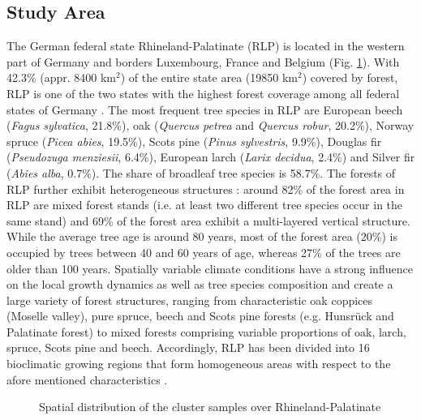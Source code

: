 \subsection{Study Area}
\label{sec:studyarea}

The German federal state Rhineland-Palatinate (RLP) is located in the western part of Germany and borders Luxembourg, France and Belgium (Fig. \ref{fig:Study Area}). With 42.3\% (appr. 8400 km$^2$) of the entire state area (19850 km$^2$) covered by forest, RLP is one of the two states with the highest forest coverage among all federal states of Germany \citep{bwi3}.  The most frequent tree species in RLP are European beech (\textit{Fagus sylvatica}, 21.8\%), oak (\textit{Quercus petrea} and \textit{Quercus robur}, 20.2\%), Norway spruce (\textit{Picea abies}, 19.5\%), Scots pine (\textit{Pinus sylvestris}, 9.9\%), Douglas fir (\textit{Pseudozuga menziesii}, 6.4\%), European larch (\textit{Larix decidua}, 2.4\%) and Silver fir (\textit{Abies alba}, 0.7\%). The share of broadleaf tree species is 58.7\%. The forests of RLP further exhibit heterogeneous structures \citep{bwi3}: around 82\% of the forest area in RLP are mixed forest stands (i.e. at least two different tree species occur in the same stand) and 69\% of the forest area exhibit a multi-layered vertical structure. While the average tree age is around 80 years, most of the forest area (20\%) is occupied by trees between 40 and 60 years of age, whereas 27\% of the trees are older than 100 years. Spatially variable climate conditions have a strong influence on the local growth dynamics as well as tree species composition and create a large variety of forest structures, ranging from characteristic oak coppices (Moselle valley), pure spruce, beech and Scots pine forests (e.g. Hunsr{\"u}ck and Palatinate forest) to mixed forests comprising variable proportions of oak, larch, spruce, Scots pine and beech. Accordingly, RLP has been divided into 16 bioclimatic growing regions that form homogeneous areas with respect to the afore mentioned characteristics \citep{gauer2005}.

\begin{figure}[H]
	\centering
	\caption{Spatial distribution of the \bwi{} cluster samples over Rhineland-Palatinate}
	\label{fig:Study Area}
\end{figure}

